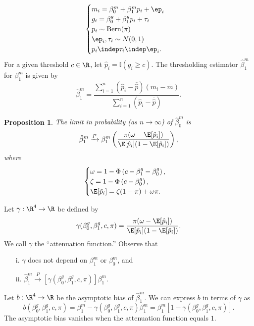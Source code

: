 \documentclass[12pt]{article}
\newtheorem{proposition}{Proposition}
\begin{document}
\begin{equation}\label{theoretical_model}
\begin{cases}
m_i = \beta^m_0 + \beta^m_1 p_i + \ep_i \\
g_i = \beta^g_0 + \beta^g_1 p_i + \tau_i \\
p_i \sim \textrm{Bern}(\pi) \\
\ep_i, \tau_i \sim N(0,1) \\
p_i \indep \tau_i \indep \ep_i.
\end{cases}
\end{equation}
For a given threshold $c \in \R$, let $\hat{p}_i = \mathbb{I}(g_i \geq c).$ The thresholding estimator $\hat{\beta}^m_1$ for $\beta^m_1$ is given by $$\hat{\beta}^m_1 = \frac{\sum_{i=1}^n (\hat{p}_i - \overline{\hat{p}}) (m_i - \overline{m})}{\sum_{i=1}^n (\hat{p}_i - \overline{\hat{p}})}.$$

\begin{proposition}
 The limit in probability (as $n \to \infty$) of $\hat{\beta}^m_0$ is
\begin{equation}\label{thresh_est_intercepts}
\hat{\beta}^m_1 \xrightarrow{P} \beta^m_1 \left(\frac{ \pi( \omega - \E[ \hat{p}_i ])}{ \E[\hat{p}_i] (1 - \E[\hat{p}_i])}\right),
\end{equation}
where
$$\begin{cases}
\omega = 1 - \Phi\left(c - \beta_1^g - \beta_0^g \right) ,\\ \zeta = 1 - \Phi\left( c - \beta^g_0 \right), \\ \E[\hat{p}_i] = \zeta(1-\pi) + \omega\pi. 
\end{cases}$$
\end{proposition}
Let $\gamma: \R^4 \to \R$ be defined by
$$ \gamma( \beta^g_0, \beta^g_1, c, \pi ) = \frac{\pi (\omega - \E[\hat{p}_i])}{\E[\hat{p}_i] (1 - \E[\hat{p}_i]) }.$$ We call $\gamma$ the ``attenuation function.'' Observe that \begin{itemize}
\item[i.] $\gamma$ does not depend on $\beta^m_1$ or $\beta^m_0$, and
\item[ii.] $\hat{\beta}^m_1 \xrightarrow{P} [\gamma(\beta_0^g, \beta_1^g, c, \pi)] \beta^m_1.$
\end{itemize}
Let $b: \R^4 \to \R$ be the asymptotic bias of $\hat{\beta}^m_1$. We can express $b$ in terms of $\gamma$ as $$b\left(\beta^g_0, \beta^g_1, c, \pi \right) = \beta^m_1 - \gamma( \beta_0^g, \beta_1^g, c, \pi) \beta^m_1 = \beta^m_1 \left[ 1- \gamma(\beta^g_0, \beta^g_1, c, \pi) \right].$$ The asymptotic bias vanishes when the attenuation function equals $1$.
\end{document}
